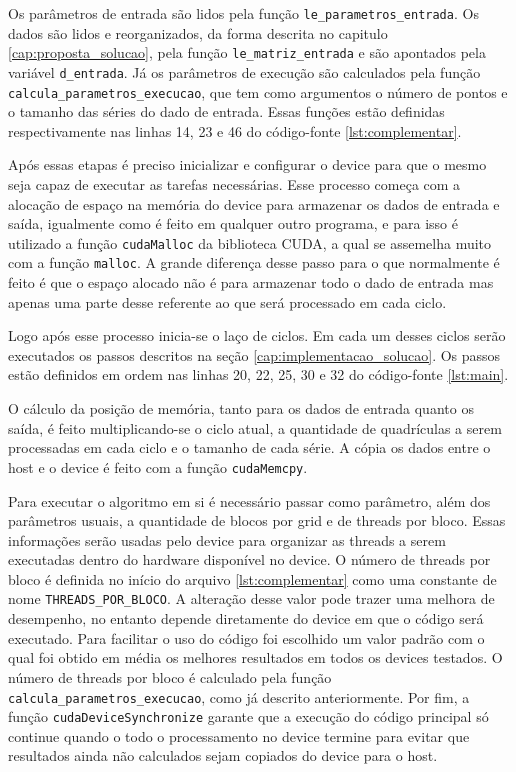 Os parâmetros de entrada são lidos pela função \texttt{le\_parametros\_entrada}. Os dados são lidos e reorganizados, da forma descrita no capitulo \ref{cap:proposta_solucao}, pela função \texttt{le\_matriz\_entrada} e são apontados pela variável \texttt{d\_entrada}. Já os parâmetros de execução são calculados pela função \texttt{calcula\_parametros\_execucao}, que tem como argumentos o número de pontos e o tamanho das séries do dado de entrada. Essas funções estão definidas respectivamente nas linhas 14, 23 e 46 do código-fonte \ref{lst:complementar}.

Após essas etapas é preciso inicializar e configurar o device para que o mesmo seja capaz de executar as tarefas necessárias. Esse processo começa com a alocação de espaço na memória do device para armazenar os dados de entrada e saída, igualmente como é feito em qualquer outro programa, e para isso é utilizado a função \texttt{cudaMalloc} da biblioteca CUDA, a qual se assemelha muito com a função \texttt{malloc}. A grande diferença desse passo para o que normalmente é feito é que o espaço alocado não é para armazenar todo o dado de entrada mas apenas uma parte desse referente ao que será processado em cada ciclo.

Logo após esse processo inicia-se o laço de ciclos. Em cada um desses ciclos serão executados os passos descritos na seção \ref{cap:implementacao_solucao}. Os passos estão definidos em ordem nas linhas 20, 22, 25, 30 e 32 do código-fonte \ref{lst:main}.



O cálculo da posição de memória, tanto para os dados de entrada quanto os saída, é feito multiplicando-se o ciclo atual, a quantidade de quadrículas a serem processadas em cada ciclo e o tamanho de cada série. A cópia os dados entre o host e o device é feito com a função \texttt{cudaMemcpy}.

Para executar o algoritmo em si é necessário passar como parâmetro, além dos parâmetros usuais, a quantidade de blocos por grid e de threads por bloco. Essas informações serão usadas pelo device para organizar as threads a serem executadas dentro do hardware disponível no device. O número de threads por bloco é definida no início do arquivo \ref{lst:complementar} como uma constante de nome \texttt{THREADS\_POR\_BLOCO}. A alteração desse valor pode trazer uma melhora de desempenho, no entanto depende diretamente do device em que o código será executado. Para facilitar o uso do código foi escolhido um valor padrão com o qual foi obtido em média os melhores resultados em todos os devices testados. O número de threads por bloco é calculado pela função \texttt{calcula\_parametros\_execucao}, como já descrito anteriormente. Por fim, a função \texttt{cudaDeviceSynchronize} garante que a execução do código principal só continue quando o todo o processamento no device termine para evitar que resultados ainda não calculados sejam copiados do device para o host.

